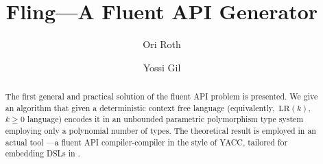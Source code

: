 \documentclass[a4paper,UKenglish,cleveref, autoref]{darts-v2019}
\title{Fling---A Fluent API Generator}
\author{Ori Roth}{Technion I.I.T Computer Science Dept., Haifa, Israel}{ori.rothh@gmail.com}{}{Technion I.I.T}%
\author{Yossi Gil}{Technion I.I.T Computer Science Dept., Haifa, Israel}{yogi@cs.technion.ac.il}{}{Technion I.I.T}
\begin{document}
\maketitle

\begin{abstract}
The first general and practical solution of the fluent API problem is
presented. We give an algorithm that given a deterministic context free
language (equivalently,~$\text{LR}(k)$,~$k≥0$ language) encodes it in an
unbounded parametric polymorphism type system employing only a polynomial
number of types. The theoretical result is employed in an actual tool
\Fling---a fluent API compiler-compiler in the style of YACC, tailored for
embedding DSLs in .


\end{abstract}

\end{document}

